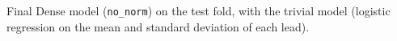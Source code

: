 \begin{table}[htbp]
\centering
\caption[Dense network: final model (test)]{Final Dense model (\texttt{no\_norm}) on the test fold, with the trivial model (logistic regression on the mean and standard deviation of each lead).}
\label{tab:dense_final}
\small
\begin{adjustbox}{max width=\textwidth}

\end{adjustbox}
\end{table}
